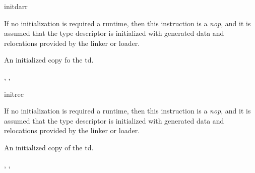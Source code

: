 \begin{instruction}{initdarr}

  \begin{notes}
    If no initialization is required a runtime, then this instruction
    is a \emph{nop}, and it is assumed that the type descriptor is
    initialized with generated data and relocations provided by the
    linker or loader.
  \end{notes}

  \begin{results}
  \item An initialized copy fo the \ac{td}.
  \end{results}

  \begin{operands}
  \item {}
  \end{operands}
  \begin{seealso}
    , ,
  \end{seealso}
\end{instruction}

\begin{instruction}{initrec}

  \begin{notes}
    If no initialization is required a runtime, then this instruction
    is a \emph{nop}, and it is assumed that the type descriptor is
    initialized with generated data and relocations provided by the
    linker or loader.
  \end{notes}

  \begin{results}
  \item An initialized copy of the \ac{td}.
  \end{results}

  \begin{operands}
  \item {}
  \end{operands}

  \begin{seealso}
    , ,
  \end{seealso}
\end{instruction}
